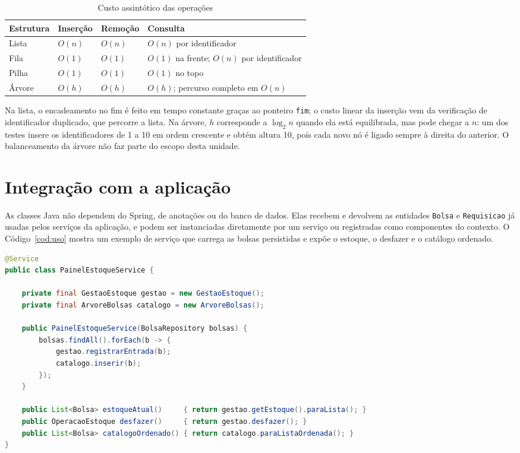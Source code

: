 \documentclass[12pt,a4paper,oneside]{report}
\newcommand{\fonte}[1][Elaborado pelos autores (2026).]{\par\vspace{2pt}{\centering\small Fonte: #1\par}\vspace{6pt}}
\newcommand{\cod}[1]{\texttt{#1}}
\begin{document}
\begin{table}[H]
\caption{Custo assintótico das operações}
\label{tab:custo}
\small
\begin{tabularx}{\textwidth}{@{}p{3cm}p{2.6cm}p{2.6cm}X@{}}
\toprule
\textbf{Estrutura} & \textbf{Inserção} & \textbf{Remoção} & \textbf{Consulta} \\
\midrule
Lista & $O(n)$ & $O(n)$ & $O(n)$ por identificador \\
Fila & $O(1)$ & $O(1)$ & $O(1)$ na frente; $O(n)$ por identificador \\
Pilha & $O(1)$ & $O(1)$ & $O(1)$ no topo \\
Árvore & $O(h)$ & $O(h)$ & $O(h)$; percurso completo em $O(n)$ \\
\bottomrule
\end{tabularx}
\fonte
\end{table}

Na lista, o encadeamento no fim é feito em tempo constante graças ao ponteiro \cod{fim}; o custo linear da inserção vem da verificação de identificador duplicado, que percorre a lista. Na árvore, $h$ corresponde a $\log_2 n$ quando ela está equilibrada, mas pode chegar a $n$: um dos testes insere os identificadores de 1 a 10 em ordem crescente e obtém altura 10, pois cada novo nó é ligado sempre à direita do anterior. O balanceamento da árvore não faz parte do escopo desta unidade.

\chapter{Integração com a aplicação}

As classes Java não dependem do Spring, de anotações ou do banco de dados. Elas recebem e devolvem as entidades \cod{Bolsa} e \cod{Requisicao} já usadas pelos serviços da aplicação, e podem ser instanciadas diretamente por um serviço ou registradas como componentes do contexto. O Código~\ref{cod:uso} mostra um exemplo de serviço que carrega as bolsas persistidas e expõe o estoque, o desfazer e o catálogo ordenado.

\begin{lstlisting}[language=Java,caption={Exemplo de uso das estruturas por um serviço da aplicação},label=cod:uso]
@Service
public class PainelEstoqueService {

    private final GestaoEstoque gestao = new GestaoEstoque();
    private final ArvoreBolsas catalogo = new ArvoreBolsas();

    public PainelEstoqueService(BolsaRepository bolsas) {
        bolsas.findAll().forEach(b -> {
            gestao.registrarEntrada(b);
            catalogo.inserir(b);
        });
    }

    public List<Bolsa> estoqueAtual()     { return gestao.getEstoque().paraLista(); }
    public OperacaoEstoque desfazer()     { return gestao.desfazer(); }
    public List<Bolsa> catalogoOrdenado() { return catalogo.paraListaOrdenada(); }
}
\end{lstlisting}
\fonte
\end{document}
